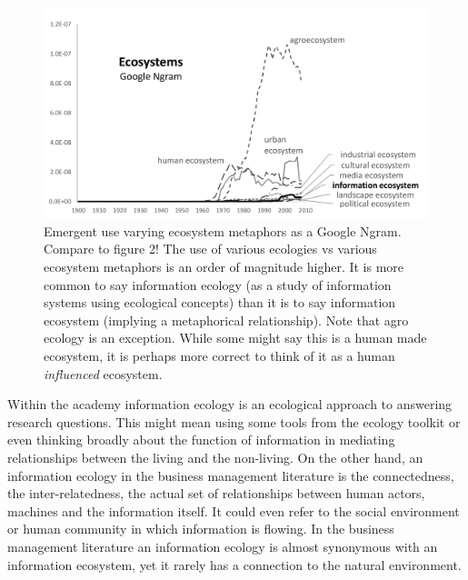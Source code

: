 \begin{figure}[!ht]
  \centering
    \includegraphics[width=5.5in]{figures/ecosystemsAll}
  \caption{Emergent use varying ecosystem metaphors as a Google Ngram. Compare to figure 2! The use of various ecologies vs various ecosystem metaphors is an order of magnitude higher. It is more common to say information ecology (as a study of information systems using ecological concepts) than it is to say information ecosystem (implying a metaphorical relationship). Note that agro ecology is an exception. While some might say this is a human made ecosystem, it is perhaps more correct to think of it as a human \textit{influenced} ecosystem.}
\end{figure}

Within the academy information ecology is an ecological approach to answering research questions. This might mean using some tools from the ecology toolkit or even thinking broadly about the function of information in mediating relationships between the living and the non-living. On the other hand, an information ecology in the business management literature is the connectedness, the inter-relatedness, the actual set of relationships between human actors, machines and the information itself. It could even refer to the social environment or human community in which information is flowing. In the business management literature an information ecology is almost synonymous with an information ecosystem, yet it rarely has a connection to the natural environment.